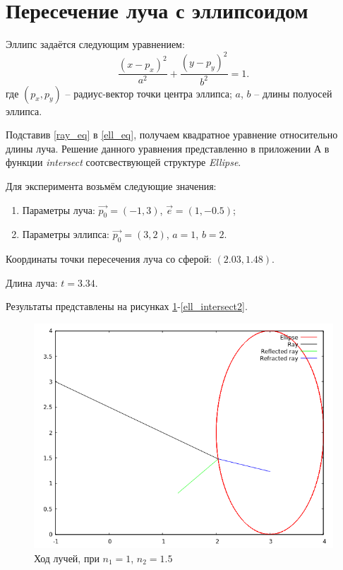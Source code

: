 \section{Пересечение луча с эллипсоидом}{
	Эллипс задаётся следующим уравнением:
	\begin{equation}\label{ell_eq}
		\frac{(x - p_x)^2}{a^2} + \frac{(y - p_y)^2}{b^2} = 1.
	\end{equation}
	где $(p_x, p_y)$ -- радиус-вектор точки центра эллипса; $a$, $b$ -- длины полуосей эллипса.
	
	Подставив \eqref{ray_eq} в \eqref{ell_eq}, получаем квадратное уравнение относительно длины луча. Решение данного уравнения представленно в приложении А в функции \textit{intersect} соотсвествующей структуре \textit{Ellipse}.
	
	Для эксперимента возьмём следующие значения:
	\begin{enumerate}
	\item Параметры луча: $\vec{p_0} = (-1, 3)$, $\vec{e} = (1, -0.5)$;
	\item Параметры эллипса: $\vec{p_0} = (3, 2)$, $a = 1$, $b = 2$.
	\end{enumerate}
	
	Координаты точки пересечения луча со сферой: $(2.03, 1.48)$.
	
	Длина луча: $t = 3.34$.
	
	Результаты представлены на рисунках \ref{ell_intersect1}-\ref{ell_intersect2}.
	
	\begin{figure}[H]
		\includegraphics[width=0.7\pagewidth]{ell_intersect1}
		\caption{Ход лучей, при $n_1 = 1$, $n_2 = 1.5$}
		\label{ell_intersect1}
	\end{figure}
	
}
